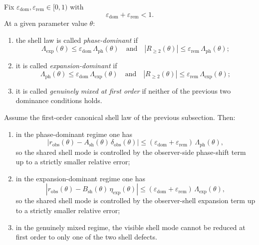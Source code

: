 \begin{definition}
Fix $\varepsilon_{\mathrm{dom}},\varepsilon_{\mathrm{rem}}\in[0,1)$ with
\[
  \varepsilon_{\mathrm{dom}}+\varepsilon_{\mathrm{rem}}<1.
\]
At a given parameter value $\theta$:
\begin{enumerate}[leftmargin=2em,label=(\roman*)]
\item the shell law is called \emph{phase-dominant} if
\[
  \Lambda_{\mathrm{exp}}(\theta)\le \varepsilon_{\mathrm{dom}}\,\Lambda_{\mathrm{ph}}(\theta)
  \quad\text{and}\quad
  |R_{\ge 2}(\theta)|\le \varepsilon_{\mathrm{rem}}\,\Lambda_{\mathrm{ph}}(\theta);
\]
\item it is called \emph{expansion-dominant} if
\[
  \Lambda_{\mathrm{ph}}(\theta)\le \varepsilon_{\mathrm{dom}}\,\Lambda_{\mathrm{exp}}(\theta)
  \quad\text{and}\quad
  |R_{\ge 2}(\theta)|\le \varepsilon_{\mathrm{rem}}\,\Lambda_{\mathrm{exp}}(\theta);
\]
\item it is called \emph{genuinely mixed at first order} if neither of the previous two dominance conditions holds.
\end{enumerate}
\end{definition}

\begin{theorem}
Assume the first-order canonical shell law of the previous subsection. Then:
\begin{enumerate}[leftmargin=2em,label=(\roman*)]
\item in the phase-dominant regime one has
\[
  |r_{\mathrm{obs}}(\theta)-A_{\mathrm{sh}}(\theta)\,\delta_{\mathrm{obs}}(\theta)|
  \le (\varepsilon_{\mathrm{dom}}+\varepsilon_{\mathrm{rem}})\,\Lambda_{\mathrm{ph}}(\theta),
\]
so the shared shell mode is controlled by the observer-side phase-shift term up to a strictly smaller relative error;
\item in the expansion-dominant regime one has
\[
  |r_{\mathrm{obs}}(\theta)-B_{\mathrm{sh}}(\theta)\,\eta_{\mathrm{exp}}(\theta)|
  \le (\varepsilon_{\mathrm{dom}}+\varepsilon_{\mathrm{rem}})\,\Lambda_{\mathrm{exp}}(\theta),
\]
so the shared shell mode is controlled by the observer-shell expansion term up to a strictly smaller relative error;
\item in the genuinely mixed regime, the visible shell mode cannot be reduced at first order to only one of the two shell defects.
\end{enumerate}
\end{theorem}

